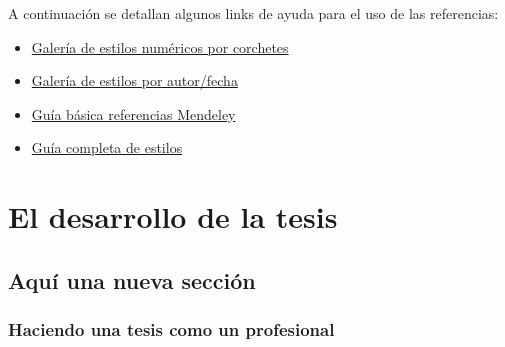 A continuación se detallan algunos links de ayuda para el uso de las referencias:

\begin{itemize}
    \item \href{https://www.bibtex.com/bibliography-styles-numeric-square-brackets}{Galería de estilos numéricos por corchetes}
    \item \href{https://www.bibtex.com/bibliography-styles-author-date}{Galería de estilos por autor/fecha}
    \item \href{https://template-latex.github.io/res/guia_basica_referencias_mendeley_v3.pdf}{Guía básica referencias Mendeley}
    \item \href{https://template-latex.github.io/doc/bibstylescompared.pdf}{Guía completa de estilos}
\end{itemize}


\chapter{El desarrollo de la tesis}

\section{Aquí una nueva sección}

\subsection{Haciendo una tesis como un profesional}


	~ \lipsum[6] \newp

	~ \lipsum[115]


